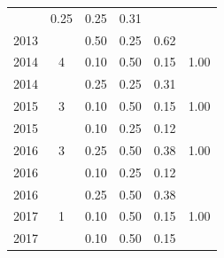 \begin{table}[H]
\begin{tabular}{| l | c | c | c | c | c |}
          &
          0.25
          &
          0.25
          &
          0.31
          &
          \\
            2013
          &
          
          &
          0.50
          &
          0.25
          &
          0.62
          &
          \\
\hline
            2014
          &
          4
          &
          0.10
          &
          0.50
          &
          0.15
          &
            {\color{blue} 1.00}
          \\
            2014
          &
          
          &
          0.25
          &
          0.25
          &
          0.31
          &
          \\
\hline
            2015
          &
          3
          &
          0.10
          &
          0.50
          &
          0.15
          &
            {\color{blue} 1.00}
          \\
            2015
          &
          
          &
          0.10
          &
          0.25
          &
          0.12
          &
          \\
\hline
            2016
          &
          3
          &
          0.25
          &
          0.50
          &
          0.38
          &
            {\color{blue} 1.00}
          \\
            2016
          &
          
          &
          0.10
          &
          0.25
          &
          0.12
          &
          \\
            2016
          &
          
          &
          0.25
          &
          0.50
          &
          0.38
          &
          \\
\hline
            2017
          &
          1
          &
          0.10
          &
          0.50
          &
          0.15
          &
            {\color{blue} 1.00}
          \\
            2017
          &
          
          &
          0.10
          &
          0.50
          &
          0.15
          &
          \\
\hline
\end{tabular}
\end{table}



